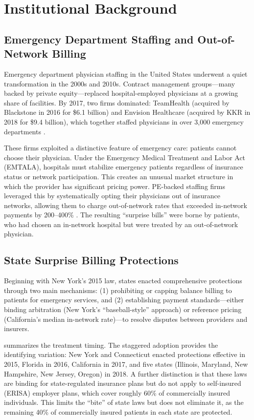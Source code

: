 \documentclass[12pt]{article}
\begin{document}
\section{Institutional Background}
\label{sec:background}

\subsection{Emergency Department Staffing and Out-of-Network Billing}

Emergency department physician staffing in the United States underwent a quiet transformation in the 2000s and 2010s. Contract management groups---many backed by private equity---replaced hospital-employed physicians at a growing share of facilities. By 2017, two firms dominated: TeamHealth (acquired by Blackstone in 2016 for \$6.1 billion) and Envision Healthcare (acquired by KKR in 2018 for \$9.4 billion), which together staffed physicians in over 3,000 emergency departments \citep{singhal2019, dafny2019}.

These firms exploited a distinctive feature of emergency care: patients cannot choose their physician. Under the Emergency Medical Treatment and Labor Act (EMTALA), hospitals must stabilize emergency patients regardless of insurance status or network participation. This creates an unusual market structure in which the provider has significant pricing power. PE-backed staffing firms leveraged this by systematically opting their physicians out of insurance networks, allowing them to charge out-of-network rates that exceeded in-network payments by 200--400\% \citep{cooperFiscella2024, garmon2019healthcare}. The resulting ``surprise bills'' were borne by patients, who had chosen an in-network hospital but were treated by an out-of-network physician.

\subsection{State Surprise Billing Protections}

Beginning with New York's 2015 law, states enacted comprehensive protections through two main mechanisms: (1) prohibiting or capping balance billing to patients for emergency services, and (2) establishing payment standards---either binding arbitration (New York's ``baseball-style'' approach) or reference pricing (California's median in-network rate)---to resolve disputes between providers and insurers.

 summarizes the treatment timing. The staggered adoption provides the identifying variation: New York and Connecticut enacted protections effective in 2015, Florida in 2016, California in 2017, and five states (Illinois, Maryland, New Hampshire, New Jersey, Oregon) in 2018. A further distinction is that these laws are binding for state-regulated insurance plans but do not apply to self-insured (ERISA) employer plans, which cover roughly 60\% of commercially insured individuals. This limits the ``bite'' of state laws but does not eliminate it, as the remaining 40\% of commercially insured patients in each state are protected.
\end{document}
